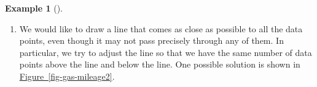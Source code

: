 \documentclass[10pt,]{book}
\theoremstyle{plain}
\theoremstyle{definition}
\theoremstyle{definition}
\newtheorem{example}[theorem]{Example}
\theoremstyle{definition}
\theoremstyle{definition}
\numberwithin{equation}{part}
\newlength{\panelmax}
\begin{document}
\begin{example}[]
\begin{enumerate}[label=*\alph**]
{{}
\newlength{\phHRimage}\setlength{\phHRimage}{\ht\panelboxHRimage+\dp\panelboxHRimage}
\settototalheight{\phHRimage}{\usebox{\panelboxHRimage}}
\setlength{\panelmax}{\maxof{\panelmax}{\phHRimage}}
\newsavebox{\panelboxHSimage}
\newlength{\phHSimage}\setlength{\phHSimage}{\ht\panelboxHSimage+\dp\panelboxHSimage}
\settototalheight{\phHSimage}{\usebox{\panelboxHSimage}}
\setlength{\panelmax}{\maxof{\panelmax}{\phHSimage}}
\leavevmode%
\setlength{\tabcolsep}{0\textwidth}
\begin{figure}
\begin{tabular}{@{}*{2}{c}@{}}
\begin{minipage}[c][\panelmax][t]{0.5\textwidth}\usebox{\panelboxHRimage}\end{minipage}&
\begin{minipage}[c][\panelmax][t]{0.5\textwidth}\usebox{\panelboxHSimage}\end{minipage}\tabularnewline
\parbox[t]{0.5\textwidth}{
}&
\parbox[t]{0.5\textwidth}{
}\end{tabular}
\end{figure}
}%
%
\item\hypertarget{li-1297}{}We would like to draw a line that comes as close as possible to all the data points, even though it may not pass precisely through any of them. In particular, we try to adjust the line so that we have the same number of data points above the line and below the line. One possible solution is shown in \hyperref[fig-gas-mileage2]{Figure~\ref{fig-gas-mileage2}}.%

\end{enumerate}
\end{example}
\end{document}
